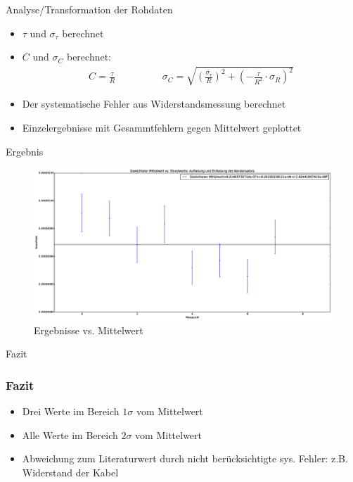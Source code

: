 \documentclass[11pt]{beamer}
\begin{document}
\begin{frame}{Analyse/Transformation der Rohdaten}
\begin{itemize}
\subsubsection{Analyse/Transformation der Rohdaten}
\item $\tau$ und $\sigma_{\tau}$ berechnet
\item $C$ und $\sigma_C$ berechnet:
\begin{align*}
C=\frac{\tau}{R} \hspace{2cm} \sigma_C=\sqrt{(\frac{\sigma_{\tau}}{R})^2+(-\frac{\tau}{R^2}\cdot \sigma_R)^2}
\end{align*}
\item Der systematische Fehler aus Widerstandsmessung berechnet
\item Einzelergebnisse mit Gesammtfehlern gegen Mittelwert geplottet
\end{itemize}
\end{frame}
\begin{frame}{Ergebnis}
\begin{figure}[hbtp]
\centering
\includegraphics[scale=0.2]{auf-entladung.eps}
\caption{Ergebnisse vs. Mittelwert}
\end{figure}
\end{frame}
\begin{frame}{Fazit}
\subsubsection{Fazit}
\begin{itemize}
\item Drei Werte im Bereich $1\sigma$ vom Mittelwert
\item Alle Werte im Bereich $2\sigma$ vom Mittelwert
\item Abweichung zum Literaturwert durch nicht berücksichtigte sys. Fehler: z.B. Widerstand der Kabel
\end{itemize}
\end{frame}
\end{document}
